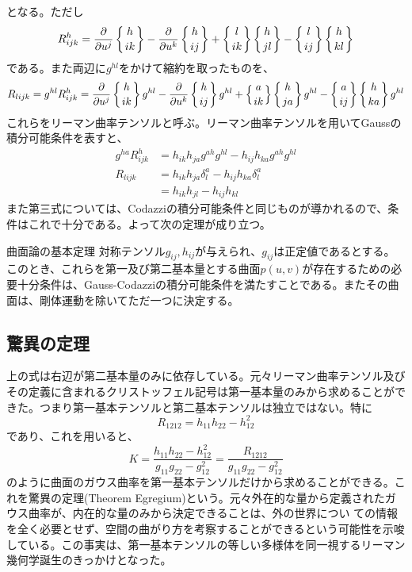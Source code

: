         となる。ただし
            \[R^h_{ijk} = \frac{\partial }{\partial u^j}\left\{h \atop ik\right\} - \frac{\partial }{\partial u^k}\left\{h \atop ij\right\}
            + \left\{l \atop ik\right\}\left\{h \atop jl\right\} - \left\{l \atop ij\right\}\left\{h \atop kl\right\}\]
        である。また両辺に$g^{hl}$をかけて縮約を取ったものを、
            \[R_{lijk} = g^{hl}R^h_{ijk}
            = \frac{\partial }{\partial u^j}\left\{h \atop ik\right\}g^{hl} - \frac{\partial }{\partial u^k}\left\{h \atop ij\right\}g^{hl}
            + \left\{a \atop ik\right\}\left\{h \atop ja\right\}g^{hl} - \left\{a \atop ij\right\}\left\{h \atop ka\right\}g^{hl}\]
        これらをリーマン曲率テンソルと呼ぶ。リーマン曲率テンソルを用いてGaussの積分可能条件を表すと、
        \begin{align*}
            g^{ha}R^h_{ijk} &= h_{ik}h_{ja}g^{ah}g^{hl} - h_{ij}h_{ka}g^{ah}g^{hl}\\
            R_{lijk} &= h_{ik}h_{ja}\delta_l^a - h_{ij}h_{ka}\delta_l^a\\
            &= h_{ik}h_{jl} - h_{ij}h_{kl}
        \end{align*}
        また第三式については、Codazziの積分可能条件と同じものが導かれるので、条件はこれで十分である。よって次の定理が成り立つ。
        \begin{thm}{曲面論の基本定理}
            対称テンソル$g_{ij},h_{ij}$が与えられ、$g_{ij}$は正定値であるとする。このとき、これらを第一及び第二基本量とする曲面$p(u,v)$が存在するための必要十分条件は、Gauss-Codazziの積分可能条件を満たすことである。またその曲面は、剛体運動を除いてただ一つに決定する。
        \end{thm}


    \subsection{驚異の定理}
        上の式は右辺が第二基本量のみに依存している。元々リーマン曲率テンソル及びその定義に含まれるクリストッフェル記号は第一基本量のみから求めることができた。つまり第一基本テンソルと第二基本テンソルは独立ではない。特に
            \[R_{1212} = h_{11}h_{22} - h_{12}^2\]
        であり、これを用いると、
            \[K = \frac{h_{11}h_{22}-h_{12}^2}{g_{11}g_{22}-g_{12}^2}
            = \frac{R_{1212}}{g_{11}g_{22}-g_{12}^2}\]
        のように曲面のガウス曲率を第一基本テンソルだけから求めることができる。これを驚異の定理(Theorem Egregium)という。元々外在的な量から定義されたガウス曲率が、内在的な量のみから決定できることは、外の世界につい
        ての情報を全く必要とせず、空間の曲がり方を考察することができるという可能性を示唆している。この事実は、第一基本テンソルの等しい多様体を同一視するリーマン幾何学誕生のきっかけとなった。


